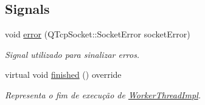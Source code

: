 \subsection*{Signals}
\begin{DoxyCompactItemize}
\item 
void \hyperlink{classWorkerThreadImpl_ae260562530b71dc55a6d360d5e4d896d}{error} (Q\+Tcp\+Socket\+::\+Socket\+Error socket\+Error)
\begin{DoxyCompactList}\small\item\em Signal utilizado para sinalizar erros. \end{DoxyCompactList}\item 
virtual void \hyperlink{classWorkerThreadImpl_aca36cb83741dce52b5d92cc7a2844257}{finished} () override
\begin{DoxyCompactList}\small\item\em Representa o fim de execução de \hyperlink{classWorkerThreadImpl}{Worker\+Thread\+Impl}. \end{DoxyCompactList}\end{DoxyCompactItemize}
